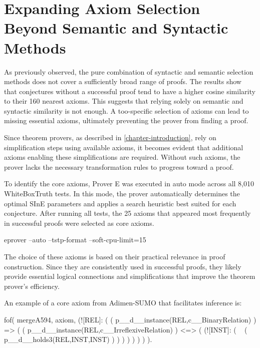 \documentclass[english,version-2020-11]{uzl-thesis}
\begin{document}
\section{Expanding Axiom Selection Beyond Semantic and Syntactic Methods}

As previously observed, the pure combination of syntactic and semantic selection methods does not cover a sufficiently broad range of proofs. The results show that conjectures without a successful proof tend to have a higher cosine similarity to their 160 nearest axioms. This suggests that relying solely on semantic and syntactic similarity is not enough. A too-specific selection of axioms can lead to missing essential axioms, ultimately preventing the prover from finding a proof.

Since theorem provers, as described in \ref{chapter-introduction}, rely on simplification steps using available axioms, it becomes evident that additional axioms enabling these simplifications are required. Without such axioms, the prover lacks the necessary transformation rules to progress toward a proof.

To identify the core axioms, Prover E was executed in auto mode across all 8,010 WhiteBoxTruth tests. In this mode, the prover automatically determines the optimal SInE parameters and applies a search heuristic best suited for each conjecture. After running all tests, the 25 axioms that appeared most frequently in successful proofs were selected as core axioms.

\begin{Pseudocode}[morekeywords = {add, create}, deletekeywords={to}, numbers=left,
    caption = {Prover E configuration}]
    eprover --auto --tstp-format --soft-cpu-limit=15
\end{Pseudocode}


The choice of these axioms is based on their practical relevance in proof construction. Since they are consistently used in successful proofs, they likely provide essential logical connections and simplifications that improve the theorem prover's efficiency.

An example of a core axiom from Adimen-SUMO that facilitates inference is:


\begin{Pseudocode}[morekeywords = {add, create}, deletekeywords={to}, numbers=left, caption = {Example core axiom}]
    fof( mergeA594, axiom,
        (![REL]: 
            (
                (
                    p__d__instance(REL,c__BinaryRelation)
                )
                =>
                (
                    (
                        p__d__instance(REL,c__IrreflexiveRelation)
                    )
                    <=>
                    (
                        (![INST]: 
                            (
                                ~ (
                                    p__d__holds3(REL,INST,INST)
                                )
                            )
                        )
                    )
                )
            )
        )
    ).
\end{Pseudocode}
\end{document}
